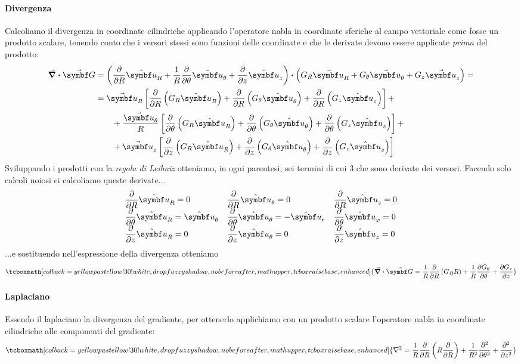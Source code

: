 \paragraph{Divergenza}
Calcoliamo il divergenza in coordinate cilindriche applicando l'operatore nabla in coordinate sferiche al campo vettoriale come fosse un prodotto scalare, tenendo conto che i versori stessi sono funzioni delle coordinate e che le derivate devono essere applicate \textit{prima} del prodotto:
\begin{align*}
	\div{\vba{G}}&=\left(\pdv{R}\vbh{u}_R+\frac{1}{R}\pdv{\theta}\vbh{u}_\theta+\pdv{z}\vbh{u}_z\right)\vdot\left(G_R\vba{u}_R+G_\theta\vba{u}_\theta+G_z\vba{u}_z\right)=\\
	&=\vba{u}_R\left[\pdv{R}\left(G_R\vbh{u}_R\right)+\pdv{R}\left(G_\theta\vbh{u}_\theta\right)+\pdv{R}\left(G_z\vbh{u}_{z}\right)\right]+\\
	&\qquad+\frac{\vba{u}_\theta}{R}\left[\pdv{\theta}\left(G_R\vbh{u}_R\right)+\pdv{\theta}\left(G_\theta\vbh{u}_\theta\right)+\pdv{\theta}\left(G_z\vbh{u}_{z}\right)\right]+\\
	&\qquad+\vba{u}_z\left[\pdv{z}\left(G_R\vbh{u}_R\right)+\pdv{z}\left(G_\theta\vbh{u}_\theta\right)+\pdv{z}\left(G_z\vbh{u}_{z}\right)\right]
\end{align*}
Sviluppando i prodotti con la \textit{regola di Leibniz} otteniamo, in ogni parentesi, sei termini di cui 3 che sono derivate dei versori. Facendo solo calcoli noiosi ci calcoliamo queste derivate...
\begin{equation*}
	\begin{array}{*3{>{\displaystyle}l}}
	\pdv{R}\vbh{u}_R=0&
	\pdv{R}\vbh{u}_\theta=0&
	\pdv{R}\vbh{u}_z=0\\
	\pdv{\theta}\vbh{u}_R=\vbh{u}_\theta&
	\pdv{\theta}\vbh{u}_\theta=-\vbh{u}_r&
	\pdv{\theta}\vbh{u}_\phi=0\\
	\pdv{z}\vbh{u}_R=0&
	\pdv{z}\vbh{u}_\theta=0&
	\pdv{z}\vbh{u}_z=0
	\end{array}
\end{equation*}
...e sostituendo nell'espressione della divergenza otteniamo
\begin{equation}
	\tcboxmath[colback=yellowpastellow!30!white,drop fuzzy shadow, nobeforeafter, math upper, tcbox raise base, enhanced]{\div{\vba{G}}=\frac{1}{R}\pdv{R}\left(G_R R\right)+\frac{1}{R}\pdv{G_\theta}{\theta}+\pdv{G_z}{z}}
\end{equation}
\paragraph{Laplaciano}
Essendo il laplaciano la divergenza del gradiente, per ottenerlo applichiamo con un prodotto scalare l'operatore nabla in coordinate cilindriche alle componenti del gradiente:
\begin{equation}
	\tcboxmath[colback=yellowpastellow!30!white,drop fuzzy shadow, nobeforeafter, math upper, tcbox raise base, enhanced]{\laplacian=\frac{1}{R}\pdv{R}\left(R\pdv{R}\right)+\frac{1}{R^2}\pdv[2]{\theta}+\pdv[2]{z}}
\end{equation}
